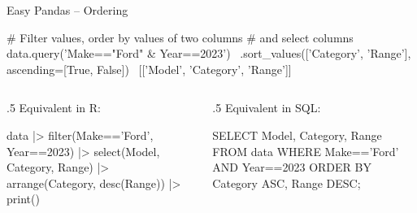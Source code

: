 \documentclass[ignorenonframetext,xcolor=x11names]{beamer}
\begin{document}
\begin{frame}[label=full,fragile]{Easy Pandas -- Ordering}
\begin{pythoncode}
# Filter values, order by values of two columns
# and select columns
data.query('Make=="Ford" & Year==2023') \
  .sort_values(['Category', 'Range'], ascending=[True, False]) \
  [['Model', 'Category', 'Range']]
\end{pythoncode}

\vspace{\baselineskip}
\begin{columns}
\begin{column}{.5\textwidth}
Equivalent in R:
\begin{Rcode}
data |> 
  filter(Make=='Ford', 
         Year==2023) |> 
  select(Model, Category, 
         Range) |>
  arrange(Category, 
          desc(Range)) |>
  print()
\end{Rcode}

\end{column}
\begin{column}{.5\textwidth}
Equivalent in SQL:

\begin{sqlcode}
SELECT Model, Category, Range
   FROM data 
   WHERE Make=='Ford' AND 
         Year==2023
   ORDER BY Category ASC, 
            Range DESC;
\end{sqlcode}
\end{column}
\end{columns}
\end{frame}
\end{document}

